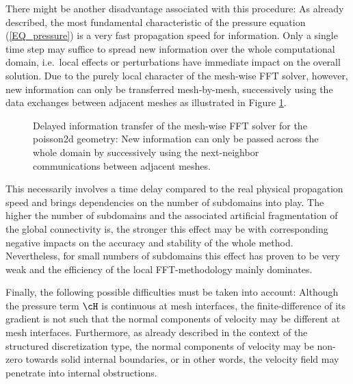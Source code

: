 There might be another disadvantage associated with this procedure:
As already described, the most fundamental characteristic of the pressure equation (\ref{EQ_pressure})  is a very fast propagation speed for information. Only a single time step may suffice to spread new information over the whole computational domain, i.e.\ local effects or perturbations have immediate impact on the overall solution. 
Due to the purely local character of the mesh-wise FFT solver, however, new information can only be transferred mesh-by-mesh, successively using the data exchanges between adjacent meshes  as illustrated in Figure \ref{FIG_mesh_wise_transfer}.
\vspace{-0.2cm}
\begin{center}
\begin{figure}[ht]
\begin{minipage}{4.3cm}

\end{minipage}
\begin{minipage}{3.9cm}

\end{minipage}
\begin{minipage}{3.9cm}

\end{minipage}
\begin{minipage}{3.9cm}

\end{minipage}
\caption[Delayed information transfer of the mesh-wise FFT solver]{Delayed information transfer of the mesh-wise FFT solver for the {\ct poisson2d} geometry: New information can only be passed across the whole domain by successively using the next-neighbor communications between adjacent meshes.}
\label{FIG_mesh_wise_transfer}
\end{figure}
\end{center}

\vspace{-0.6cm}
This necessarily involves a time delay compared to the real physical propagation speed and brings dependencies on the number of subdomains into play.
The higher the number of subdomains and the associated artificial fragmentation of the global connectivity is, the stronger this effect may be with corresponding negative impacts on the accuracy and stability of the whole method.
Nevertheless, for small numbers of subdomains this effect has proven to be very weak and the efficiency of the local FFT-methodology mainly dominates.


Finally, the following possible difficulties must be taken into account: Although the pressure term $\cH$ is continuous at mesh interfaces, the finite-difference of its gradient is not such that the normal components of velocity may be different at mesh interfaces. Furthermore, as already described in the context of
the structured discretization type, the normal components of velocity may be non-zero towards solid internal boundaries, or in other words, the velocity field may penetrate into internal obstructions. 

